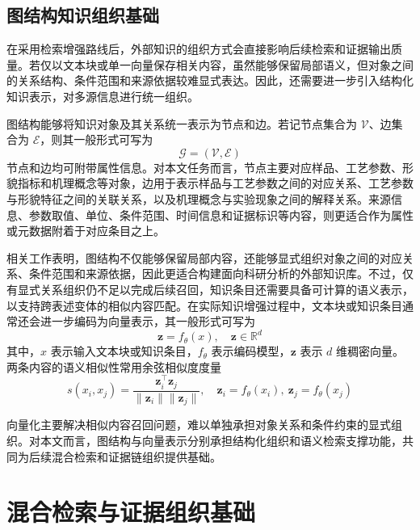 \subsection{图结构知识组织基础}

在采用检索增强路线后，外部知识的组织方式会直接影响后续检索和证据输出质量。若仅以文本块或单一向量保存相关内容，虽然能够保留局部语义，但对象之间的关系结构、条件范围和来源依据较难显式表达\cite{Statt2023,Venugopal2024}。因此，还需要进一步引入结构化知识表示，对多源信息进行统一组织。

图结构能够将知识对象及其关系统一表示为节点和边。若记节点集合为 $\mathcal{V}$、边集合为 $\mathcal{E}$，则其一般形式可写为
\begin{equation}
    \mathcal{G}=(\mathcal{V},\mathcal{E})
\end{equation}
节点和边均可附带属性信息。对本文任务而言，节点主要对应样品、工艺参数、形貌指标和机理概念等对象，边用于表示样品与工艺参数之间的对应关系、工艺参数与形貌特征之间的关联关系，以及机理概念与实验现象之间的解释关系。来源信息、参数取值、单位、条件范围、时间信息和证据标识等内容，则更适合作为属性或元数据附着于对应条目之上。

相关工作表明，图结构不仅能够保留局部内容，还能够显式组织对象之间的对应关系、条件范围和来源依据，因此更适合构建面向科研分析的外部知识库\cite{LiuQiao2016KGConstructionCN,Wilkinson2016FAIR,Lebo2013PROVO,Hogan2021KG,WangXin2019KGDataManagementCN}。不过，仅有显式关系组织仍不足以完成后续召回，知识条目还需要具备可计算的语义表示，以支持跨表述变体的相似内容匹配。在实际知识增强过程中，文本块或知识条目通常还会进一步编码为向量表示，其一般形式可写为
\begin{equation}
    \mathbf{z}=f_{\theta}(x), \quad \mathbf{z}\in \mathbb{R}^{d}
\end{equation}
其中，$x$ 表示输入文本块或知识条目，$f_{\theta}$ 表示编码模型，$\mathbf{z}$ 表示 $d$ 维稠密向量。两条内容的语义相似性常用余弦相似度度量
\begin{equation}
    s(x_i,x_j)=\frac{\mathbf{z}_i^{\top}\mathbf{z}_j}{\|\mathbf{z}_i\|\|\mathbf{z}_j\|}, \quad \mathbf{z}_i=f_{\theta}(x_i), \ \mathbf{z}_j=f_{\theta}(x_j)
\end{equation}

向量化主要解决相似内容召回问题，难以单独承担对象关系和条件约束的显式组织\cite{Reimers2019SentenceBERT}。对本文而言，图结构与向量表示分别承担结构化组织和语义检索支撑功能，共同为后续混合检索和证据链组织提供基础。

\section{混合检索与证据组织基础}

